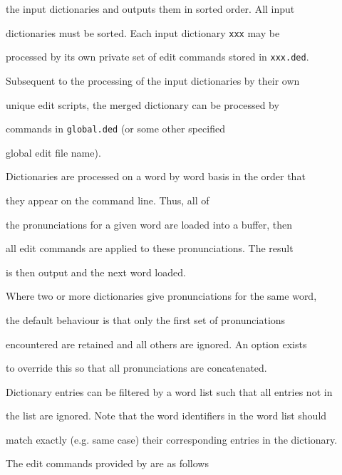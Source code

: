 the input dictionaries and outputs them in sorted order.  All input


dictionaries must be sorted.  Each input dictionary \texttt{xxx} may be


processed by its own private set of edit commands stored in \texttt{xxx.ded}.


Subsequent to the processing of the input dictionaries by their own


unique edit scripts, the merged dictionary can be processed by


commands in \texttt{global.ded} (or some other specified 


global edit file name).





Dictionaries are processed on a word by word basis in the order that


they appear on the command line.  Thus, all of 


the pronunciations for a given word are loaded into a buffer, then


all edit commands are applied to these pronunciations.  The result


is then output and the next word loaded.





Where two or more dictionaries give pronunciations for the same word,


the default behaviour is that only the first set of pronunciations


encountered are retained and all others are ignored.  An option exists


to override this so that all pronunciations are concatenated.





Dictionary entries can be filtered by a word list such that all entries not in


the list are ignored. Note that the word identifiers in the word list should


match exactly (e.g. same case) their corresponding entries in the dictionary.





The edit commands provided by  are as follows











